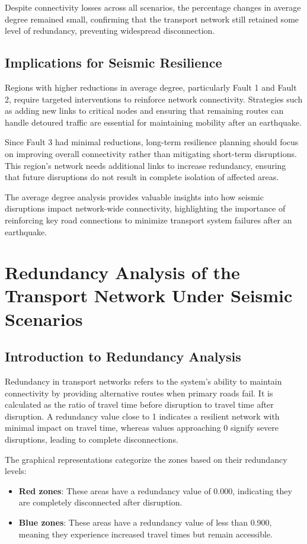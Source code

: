 Despite connectivity losses across all scenarios, the percentage changes in average degree remained small, confirming that the transport network still retained some level of redundancy, preventing widespread disconnection.

\subsection{Implications for Seismic Resilience}
Regions with higher reductions in average degree, particularly Fault 1 and Fault 2, require targeted interventions to reinforce network connectivity. Strategies such as adding new links to critical nodes and ensuring that remaining routes can handle detoured traffic are essential for maintaining mobility after an earthquake.

Since Fault 3 had minimal reductions, long-term resilience planning should focus on improving overall connectivity rather than mitigating short-term disruptions. This region’s network needs additional links to increase redundancy, ensuring that future disruptions do not result in complete isolation of affected areas.

The average degree analysis provides valuable insights into how seismic disruptions impact network-wide connectivity, highlighting the importance of reinforcing key road connections to minimize transport system failures after an earthquake.

\section{Redundancy Analysis of the Transport Network Under Seismic Scenarios}
\subsection{Introduction to Redundancy Analysis}
Redundancy in transport networks refers to the system’s ability to maintain connectivity by providing alternative routes when primary roads fail. It is calculated as the ratio of travel time before disruption to travel time after disruption. A redundancy value close to 1 indicates a resilient network with minimal impact on travel time, whereas values approaching 0 signify severe disruptions, leading to complete disconnections.

The graphical representations categorize the zones based on their redundancy levels:

\begin{itemize}
    \item \textbf{Red zones}: These areas have a redundancy value of 0.000, indicating they are completely disconnected after disruption.
    \item \textbf{Blue zones}: These areas have a redundancy value of less than 0.900, meaning they experience increased travel times but remain accessible.
\end{itemize}

